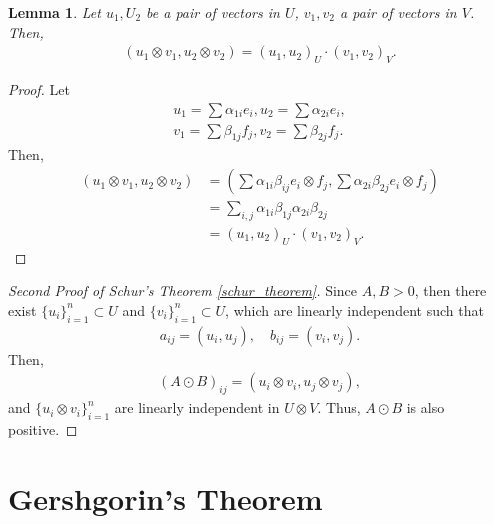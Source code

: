 \documentclass[10pt]{book}
\newtheorem{lemma}[theorem]{Lemma}
\theoremstyle{definition}
\numberwithin{equation}{chapter}
\begin{document}
\begin{subappendices}
\begin{lemma}
Let $u_1, U_2$ be a pair of vectors in $U$, $v_1, v_2$ a pair of vectors in $V$. Then,
\begin{align*}
    (u_1 \otimes v_1, u_2 \otimes v_2) = (u_1, u_2)_U \cdot (v_1, v_2)_V.
\end{align*}
\end{lemma}
\begin{proof}
Let
\begin{align*}
    u_1 = \sum \alpha_{1i} e_i, u_2 = \sum \alpha_{2i} e_i, \\
    v_1 = \sum \beta_{1j} f_j, v_2 = \sum \beta_{2j} f_j.
\end{align*}
Then, 
\begin{align*}
    (u_1 \otimes v_1, u_2 \otimes v_2) & = \left(\sum \alpha_{1i} \beta_{ij} e_i \otimes f_j, \sum \alpha_{2i} \beta_{2j} e_i \otimes f_j \right) \\
    & = \sum_{i,j} \alpha_{1i} \beta_{1j} \alpha_{2i} \beta_{2j} \\
    & = (u_1, u_2)_U \cdot (v_1, v_2)_V.
\end{align*}
\end{proof}

\medskip

\begin{proof}[Second Proof of Schur's Theorem \ref{schur_theorem}]
Since $A, B > 0$, then there exist $\{u_i\}^n_{i=1} \subset U$ and $\{v_i\}^n_{i=1} \subset U$, which are linearly independent such that
\begin{align*}
    a_{ij} = (u_i, u_j), \quad b_{ij} = (v_i, v_j).
\end{align*}
Then, 
\begin{align*}
    (A \odot B)_{ij} = \left(u_i \otimes v_i, u_j \otimes v_j \right),
\end{align*}
and $\{u_i \otimes v_i\}^n_{i=1}$ are linearly independent in $U \otimes V$. Thus, $A \odot B$ is also positive.
\end{proof}

\section{Gershgorin's Theorem}


\end{subappendices}
\end{document}
